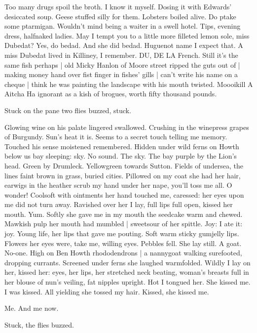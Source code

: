 Too many drugs spoil the broth.
I know it myself.
Dosing it with Edwards' desiccated soup.
Geese stuffed silly for them.
Lobsters boiled alive.
Do ptake some ptarmigan.
Wouldn't mind being a waiter in a swell hotel.
Tips,
evening dress,
halfnaked ladies.
May I tempt you to a little more filleted lemon sole,
miss Dubedat?
Yes, do bedad.
And she did bedad.
Huguenot name I expect that.
A miss Dubedat lived in Killiney,
I remember.
DU, DE LA
French.
Still it's the same fish perhaps |
old Micky Hanlon of Moore street ripped the guts out of |
making money hand over fist finger in fishes' gills |
can't write his name on a cheque |
think he was painting the landscape with his mouth twisted.
Moooikill A Aitcha Ha ignorant as a kish of brogues,
worth fifty thousand pounds.

Stuck on the pane two flies buzzed,
stuck.

Glowing wine on his palate lingered swallowed.
Crushing in the winepress grapes of Burgundy.
Sun's heat it is.
Seems to a secret touch telling me memory.
Touched his sense moistened remembered.
Hidden under wild ferns on Howth below us bay sleeping:
sky.
No sound.
The sky.
The bay purple by the Lion's head.
Green by Drumleck.
Yellowgreen towards Sutton.
Fields of undersea,
the lines faint brown in grass,
buried cities.
Pillowed on my coat she had her hair,
earwigs in the heather scrub my hand under her nape,
you'll toss me all.
O wonder!
Coolsoft with ointments her hand touched me,
caressed:
her eyes upon me did not turn away.
Ravished over her I lay,
full lips full open,
kissed her mouth.
Yum.
Softly she gave me in my mouth the seedcake warm and chewed.
Mawkish pulp her mouth had mumbled |
sweetsour of her spittle.
Joy:
I ate it:
joy.
Young life,
her lips that gave me pouting.
Soft warm sticky gumjelly lips.
Flowers her eyes were,
take me,
willing eyes.
Pebbles fell.
She lay still.
A goat.
No-one.
High on Ben Howth rhododendrons |
a nannygoat walking surefooted, dropping currants.
Screened under ferns she laughed warmfolded.
Wildly I lay on her,
kissed her:
eyes, her lips,
her stretched neck beating,
woman's breasts full in her blouse of nun's veiling,
fat nipples upright.
Hot I tongued her.
She kissed me.
I was kissed.
All yielding she tossed
my hair.
Kissed, she kissed me.

Me.
And me now.

Stuck,
the flies buzzed.

